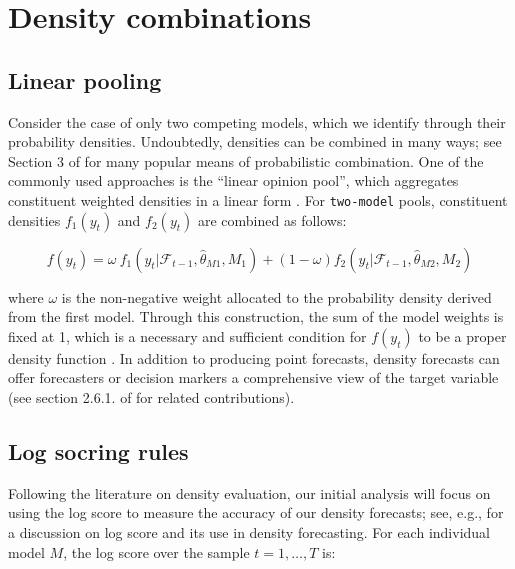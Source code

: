 \documentclass{monashthesis}
\begin{document}
\hypertarget{density-combinations}{%
\section{Density combinations}\label{density-combinations}}

\hypertarget{linear-pooling}{%
\subsection{Linear pooling}\label{linear-pooling}}

Consider the case of only two competing models, which we identify through their probability densities. Undoubtedly, densities can be combined in many ways; see Section 3 of \textcite{WHLK22} for many popular means of probabilistic combination. One of the commonly used approaches is the ``linear opinion pool'', which aggregates constituent weighted densities in a linear form \autocites[e.g.,][]{BG69,HM07,GA11}. For \texttt{two-model} pools, constituent densities \(f_1(y_t)\) and \(f_2(y_t)\) are combined as follows:

\begin{equation}
\label{eqn:LC1}
f(y_t) = \omega \ f_1(y_t | \mathcal{F}_{t-1}, \hat\theta_{M1}, M_1) + (1-\omega) f_2(y_t | \mathcal{F}_{t-1}, \hat\theta_{M2}, M_2)
\end{equation}

where \(\omega\) is the non-negative weight allocated to the probability density derived from the first model. Through this construction, the sum of the model weights is fixed at 1, which is a necessary and sufficient condition for \(f(y_t)\) to be a proper density function \autocite{GA11}. In addition to producing point forecasts, density forecasts can offer forecasters or decision markers a comprehensive view of the target variable (see section 2.6.1. of \textcite{FTP22} for related contributions).

\hypertarget{log-socring-rules}{%
\subsection{Log socring rules}\label{log-socring-rules}}

Following the literature on density evaluation, our initial analysis will focus on using the log score to measure the accuracy of our density forecasts; see, e.g., \textcite{GA11} for a discussion on log score and its use in density forecasting. For each individual model \(M\), the log score over the sample \(t = 1, \dots, T\) is:
\end{document}
